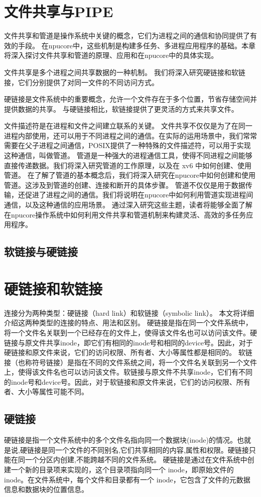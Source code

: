 \section{文件共享与PIPE}
文件共享和管道是操作系统中关键的概念，它们为进程之间的通信和协同提供了有效的手段。
在npucore中，这些机制是构建多任务、多进程应用程序的基础。本章将深入探讨文件共享和管道的原理、应用和在npucore中的具体实现。

文件共享是多个进程之间共享数据的一种机制。
我们将深入研究硬链接和软链接，它们分别提供了对同一文件的不同访问方式。

硬链接是文件系统中的重要概念，允许一个文件存在于多个位置，节省存储空间并提供数据的共享。
与硬链接相比，软链接提供了更灵活的方式来共享文件。

文件描述符是在进程和文件之间建立联系的关键。
文件共享不仅仅是为了在同一进程内部使用，还可以用于不同进程之间的通信。在实际的运用场景中，我们常常需要在父子进程之间通信，POSIX提供了一种特殊的文件描述符，可以用于实现这种通信，叫做管道。
管道是一种强大的进程通信工具，使得不同进程之间能够直接传递数据。我们将深入研究管道的工作原理，以及在 xv6 中如何创建、使用管道。
在了解了管道的基本概念后，我们将深入研究在npucore中如何创建和使用管道。这涉及到管道的创建、连接和断开的具体步骤。
管道不仅仅是用于数据传输，还促进了进程之间的通信。我们将说明在npucore中如何利用管道实现进程间通信，以及这种通信的应用场景。
通过深入研究这些主题，读者将能够全面了解在npucore操作系统中如何利用文件共享和管道机制来构建灵活、高效的多任务应用程序。

\subsection{软链接与硬链接}

\section{硬链接和软链接}
连接分为两种类型：硬链接（hard link）和软链接（symbolic link）。
本文将详细介绍这两种类型的连接的特点、用法和区别。
硬链接是指在同一个文件系统中，将一个文件名关联到一个已经存在的文件上，使得该文件名也可以访问该文件。硬链接与原文件共享inode，即它们有相同的inode号和相同的device号。因此，对于硬链接和原文件来说，它们的访问权限、所有者、大小等属性都是相同的。
软链接（也称符号链接）是指在不同的文件系统之间，将一个文件名关联到另一个文件上，使得该文件名也可以访问该文件。软链接与原文件不共享inode，它们有不同的inode号和device号。因此，对于软链接和原文件来说，它们的访问权限、所有者、大小等属性可能不同。
\subsection{硬链接}
硬链接是指一个文件系统中的多个文件名指向同一个数据块(inode)的情况。也就是说,硬链接是同一个文件的不同别名,它们共享相同的内容,属性和权限。硬链接只能在同一个分区内创建,不能跨越不同的文件系统。
硬链接是通过在文件系统中创建一个新的目录项来实现的，这个目录项指向同一个 inode，即原始文件的 inode。在文件系统中，每个文件和目录都有一个 inode，它包含了文件的元数据信息和数据块的位置信息。

